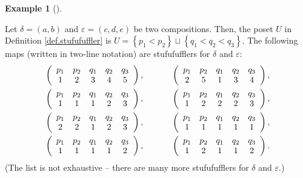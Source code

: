 \documentclass[numbers=enddot,12pt,final,onecolumn,notitlepage]{scrartcl}%
\theoremstyle{definition}
\newtheorem{exam}[theo]{Example}
\newenvironment{example}[1][]
{\begin{exam}[#1]\begin{leftbar}}
{\end{leftbar}\end{exam}}
\begin{document}
\begin{example}
Let $\delta=\left(  a,b\right)  $ and $\varepsilon=\left(  c,d,e\right)  $ be
two compositions. Then, the poset $U$ in Definition \ref{def.stufufuffler} is
$U=\left\{  p_{1}<p_{2}\right\}  \sqcup\left\{  q_{1}<q_{2}<q_{3}\right\}  $.
The following maps (written in two-line notation) are stufufufflers for
$\delta$ and $\varepsilon$:%
\begin{align*}
&  \left(
\begin{array}
[c]{ccccc}%
p_{1} & p_{2} & q_{1} & q_{2} & q_{3}\\
1 & 2 & 3 & 4 & 5
\end{array}
\right)  ,\ \ \ \ \ \ \ \ \ \ \left(
\begin{array}
[c]{ccccc}%
p_{1} & p_{2} & q_{1} & q_{2} & q_{3}\\
2 & 5 & 1 & 3 & 4
\end{array}
\right)  ,\\
&  \left(
\begin{array}
[c]{ccccc}%
p_{1} & p_{2} & q_{1} & q_{2} & q_{3}\\
1 & 1 & 1 & 2 & 3
\end{array}
\right)  ,\ \ \ \ \ \ \ \ \ \ \left(
\begin{array}
[c]{ccccc}%
p_{1} & p_{2} & q_{1} & q_{2} & q_{3}\\
1 & 2 & 2 & 2 & 3
\end{array}
\right)  ,\\
&  \left(
\begin{array}
[c]{ccccc}%
p_{1} & p_{2} & q_{1} & q_{2} & q_{3}\\
2 & 2 & 1 & 2 & 3
\end{array}
\right)  ,\ \ \ \ \ \ \ \ \ \ \left(
\begin{array}
[c]{ccccc}%
p_{1} & p_{2} & q_{1} & q_{2} & q_{3}\\
1 & 1 & 1 & 1 & 1
\end{array}
\right)  ,\\
&  \left(
\begin{array}
[c]{ccccc}%
p_{1} & p_{2} & q_{1} & q_{2} & q_{3}\\
1 & 1 & 1 & 1 & 2
\end{array}
\right)  ,\ \ \ \ \ \ \ \ \ \ \left(
\begin{array}
[c]{ccccc}%
p_{1} & p_{2} & q_{1} & q_{2} & q_{3}\\
1 & 2 & 1 & 1 & 2
\end{array}
\right)  .
\end{align*}
(The list is not exhaustive -- there are many more stufufufflers for $\delta$
and $\varepsilon$.)


\end{example}
\end{document}
